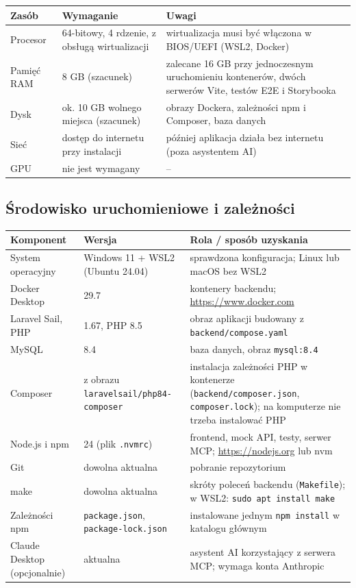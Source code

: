 \documentclass[11pt,a4paper,oneside]{article}
\newif\ifpodpowiedzi
\newcommand{\podpowiedz}[1]{\ifpodpowiedzi\par\begingroup\small\color{hintcolor}\textit{Wskazówka: #1}\par\endgroup\fi}
\begin{document}
\begin{tabularx}{\textwidth}{@{}l Y Y@{}}
\toprule
Zasób & Wymaganie & Uwagi\\
\midrule
Procesor & 64-bitowy, 4 rdzenie, z obsługą wirtualizacji & wirtualizacja musi być włączona w BIOS/UEFI (WSL2, Docker)\\
Pamięć RAM & 8 GB (szacunek) & zalecane 16 GB przy jednoczesnym uruchomieniu kontenerów, dwóch serwerów Vite, testów E2E i Storybooka\\
Dysk & ok. 10 GB wolnego miejsca (szacunek) & obrazy Dockera, zależności npm i Composer, baza danych\\
Sieć & dostęp do internetu przy instalacji & później aplikacja działa bez internetu (poza asystentem AI)\\
GPU & nie jest wymagany & --\\
\bottomrule
\end{tabularx}

\subsection{Środowisko uruchomieniowe i zależności}
\podpowiedz{Wymień system operacyjny, środowiska uruchomieniowe, narzędzia, biblioteki i usługi wraz ze sprawdzonymi wersjami. Uwzględnij bazę danych, kontenery, oprogramowanie specjalistyczne i wtyczki, jeśli występują. Podaj pliki określające zależności oraz sposób ich instalacji. Wskaż wymagany dostęp do sieci lub usług zewnętrznych.}
\begin{tabularx}{\textwidth}{@{}Y l Y@{}}
\toprule
Komponent & Wersja & Rola / sposób uzyskania\\
\midrule
System operacyjny & Windows 11 + WSL2 (Ubuntu 24.04) & sprawdzona konfiguracja; Linux lub macOS bez WSL2\\
Docker Desktop & 29.7 & kontenery backendu; \url{https://www.docker.com}\\
Laravel Sail, PHP & 1.67, PHP 8.5 & obraz aplikacji budowany z \texttt{backend/compose.yaml}\\
MySQL & 8.4 & baza danych, obraz \texttt{mysql:8.4}\\
Composer & z obrazu \texttt{laravelsail/php84-composer} & instalacja zależności PHP w kontenerze (\texttt{backend/\allowbreak composer.json}, \texttt{composer.lock}); na komputerze nie trzeba instalować PHP\\
Node.js i npm & 24 (plik \texttt{.nvmrc}) & frontend, mock API, testy, serwer MCP; \url{https://nodejs.org} lub nvm\\
Git & dowolna aktualna & pobranie repozytorium\\
make & dowolna aktualna & skróty poleceń backendu (\texttt{Makefile}); w WSL2: \texttt{sudo apt install make}\\
Zależności npm & \texttt{package.json}, \texttt{package-lock.json} & instalowane jednym \texttt{npm install} w katalogu głównym\\
Claude Desktop (opcjonalnie) & aktualna & asystent AI korzystający z serwera MCP; wymaga konta Anthropic\\
\bottomrule
\end{tabularx}
\end{document}
